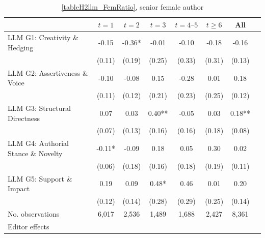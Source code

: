\begin{table}
    \footnotesize
    \centering
    \begin{threeparttable}
        \caption{\autoref{tableH2llm_FemRatio}, senior female author}
        \label{tableH2llm_FemSenior}
        \begin{tabular}{p{3cm}S@{}S@{}S@{}S@{}S@{}S@{}S@{}}
            \toprule
            &{\(t=1\)}&{\(t=2\)}&{\(t=3\)}&{\(t=4\text{--}5\)}&{\(t\ge6\)}&{All}\\
            \midrule
            LLM G1: Creativity \& Hedging &       -0.15   &       -0.36*  &       -0.01   &       -0.10   &       -0.18   &       -0.16   \\
                                          &      (0.11)   &      (0.19)   &      (0.25)   &      (0.33)   &      (0.31)   &      (0.13)   \\
            LLM G2: Assertiveness \& Voice&       -0.10   &       -0.08   &        0.15   &       -0.28   &        0.01   &        0.18   \\
                                          &      (0.11)   &      (0.12)   &      (0.21)   &      (0.23)   &      (0.25)   &      (0.12)   \\
            LLM G3: Structural Directness &        0.07   &        0.03   &        0.40** &       -0.05   &        0.03   &        0.18** \\
                                          &      (0.07)   &      (0.13)   &      (0.16)   &      (0.16)   &      (0.18)   &      (0.08)   \\
            LLM G4: Authorial Stance \& Novelty&       -0.11*  &       -0.09   &        0.18   &        0.05   &        0.30   &        0.02   \\
                                          &      (0.06)   &      (0.18)   &      (0.16)   &      (0.18)   &      (0.19)   &      (0.11)   \\
            LLM G5: Support \& Impact     &        0.19   &        0.09   &        0.48*  &        0.46   &        0.01   &        0.20   \\
                                          &      (0.12)   &      (0.14)   &      (0.28)   &      (0.29)   &      (0.25)   &      (0.14)   \\
            \midrule
            No. observations              &       6,017   &       2,536   &       1,489   &       1,688   &       2,427   &       8,361   \\
            \midrule
Editor effects        &           {}   &           {}   &           {}   &           {}   &           {}   &           {}   \\

\end{tabular}
\end{threeparttable}
\end{table}
